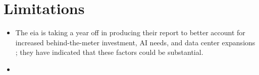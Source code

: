 \section{Limitations}
\label{sec:limitations}

\begin{itemize}
    \item The \gls{eia} is taking a year off in producing their report to better account for increased behind-the-meter investment, AI needs, and data center expansions \cite{eia_annual_outlook_canceled_2023}; they have indicated that these factors could be substantial.
    \item
\end{itemize}
